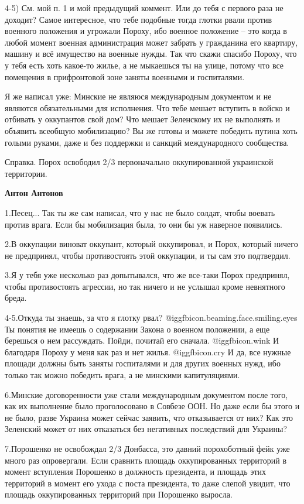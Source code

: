 \begin{itemize}
\begin{itemize}
4-5) См. мой п. 1 и мой предыдущий коммент. Или до тебя с первого раза не
доходит? Самое интересное, что тебе подобные тогда глотки рвали против военного
положения и угрожали Пороху, ибо военное положение – это когда в любой момент
военная администрация может забрать у гражданина его квартиру, машину и всё
имущество на военные нужды. Так что скажи спасибо Пороху, что у тебя есть хоть
какое-то жилье, а не мыкаешься ты на улице, потому что все помещения в
прифронтовой зоне заняты военными и госпиталями.

Я же написал уже: Минские не являюся международным документом и не являются
обязательными для исполнения. Что тебе мешает вступить в войско и отбивать у
оккупантов свой дом? Что мешает Зеленскому их не выполнять и объявить всеобщую
мобилизацию? Вы же готовы и можете победить путина хоть голыми руками, даже и
без поддержки и санкций международного сообщества.

Справка. Порох освободил 2/3 первоначально оккупированной украинской
территории.

\textbf{Антон Антонов} 

1.Песец... Так ты же сам написал, что у нас не было солдат, чтобы воевать
против врага. Если бы мобилизация была, то они бы уж наверное появились. 

2.В оккупации виноват оккупант, который оккупировал, и Порох, который ничего не
предпринял, чтобы противостоять этой оккупации, и ты сам это подтвердил. 

3.Я у тебя уже несколько раз допытывался, что же все-таки Порох предпринял,
чтобы противостоять агрессии, но так ничего и не услышал кроме невнятного
бреда.

4-5.Откуда ты знаешь, за что я глотку рвал?  @igg{fbicon.beaming.face.smiling.eyes}  Ты понятия не имеешь о
содержании Закона о военном положении, а еще берешься о нем рассуждать. Пойди,
почитай его сначала.  @igg{fbicon.wink}  И благодаря Пороху у меня как раз и нет жилья.  @igg{fbicon.cry}  И да,
все нужные площади должны быть заняты госпиталями и для других военных нужд,
ибо только так можно победить врага, а не минскими капитуляциями. 

6.Минские договоренности уже стали международным документом после того, как их
выполнение было проголосовано в Совбезе ООН. Но даже если бы этого и не было,
разве Украина может сейчас заявить, что отказывается от них? Как это Зеленский
может от них отказаться без негативных последствий для Украины? 

7.Порошенко не освобождал 2/3 Донбасса, это давний порохоботный фейк уже много
раз опровергали. Если сравнить площадь оккупированных территорий в момент
вступления Порошенко в должность президента, и площадь этих территорий в момент
его ухода с поста президента, то даже слепой увидит, что площадь оккупированных
территорий при Порошенко выросла.


\end{itemize}
\end{itemize}
